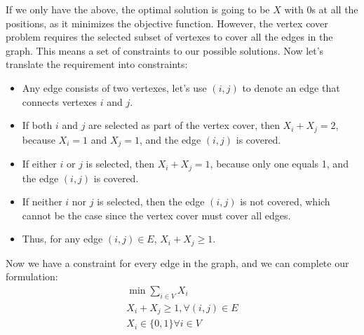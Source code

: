 \documentclass{article}
\begin{document}
If we only have the above, the optimal solution is going to be $X$ with 0s at
all the positions, as it minimizes the objective function.
However, the vertex cover problem requires the selected subset of vertexes to
cover all the edges in the graph. This means a set of constraints to our
possible solutions. Now let's translate the requirement into constraints:
\begin{itemize}
\item Any edge consists of two vertexes, let's use $(i,j)$
	to denote an edge that connects vertexes $i$ and $j$.
\item If both $i$ and $j$ are selected as part of the vertex cover,
	then $X_i + X_j = 2$, because $X_i = 1$ and $X_j = 1$, and the edge
	$(i,j)$ is covered.
\item If either $i$ or $j$ is selected, then $X_i + X_j = 1$, because only one 
	equals 1, and the edge $(i,j)$ is covered.
\item If neither $i$ nor $j$ is selected, then the edge $(i,j)$ is not covered,
	which cannot be the case since the vertex cover must cover all edges.
\item Thus, for any edge $(i, j) \in E$, $X_i + X_j \ge 1$.
\end{itemize}

Now we have a constraint for every edge in the graph, and we can complete our
formulation:
\begin{equation}
\label{eq:vc_ilp}
\begin{split}
	\min \sum_{i \in V} X_i\\
	X_i + X_j \ge 1, \forall (i, j) \in E\\
	X_i \in \{0, 1\} \forall i \in V
\end{split}
\end{equation}
\end{document}
